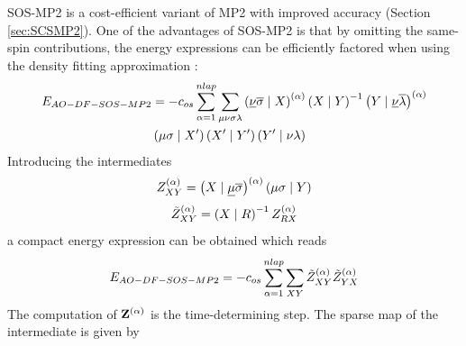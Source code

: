 SOS-MP2 is a cost-efficient variant of MP2 with improved  accuracy (Section \ref{sec:SCSMP2}). One of the advantages of SOS-MP2 is that by omitting the same-spin contributions, the energy expressions can be efficiently factored when using the density fitting approximation \cite{Mau2014,Gla2020}: 
\begin{equation}
\begin{split}
E_{AO-DF-SOS-MP2} &= - c_{os} \sum^{nlap}_{\alpha=1} \sum_{\mu\nu\sigma\lambda} \left( \underline{\nu}\overline{\sigma} \mid X \right)^{(\alpha)} \left( X \mid Y \right)^{-1} \left( Y \mid \underline{\nu}\overline{\lambda} \right)^{(\alpha)} \\
& \left( \mu\sigma \mid X' \right) \left( X' \mid Y' \right) \left( Y' \mid \nu\lambda \right)
\end{split}
\end{equation}
\noindent Introducing the intermediates
\begin{equation}
Z^{(\alpha)}_{XY} = \left( X \mid \underline{\mu}\overline{\sigma} \right)^{(\alpha)} \left( \mu\sigma \mid Y \right)
\end{equation}
\begin{equation}
\tilde{Z}^{(\alpha)}_{XY} = \left( X \mid R \right)^{-1} Z^{(\alpha)}_{RX}
\end{equation}
\noindent a compact energy expression can be obtained which reads
\begin{equation}
E_{AO-DF-SOS-MP2} = - c_{os} \sum^{nlap}_{\alpha=1} \sum_{XY} \tilde{Z}^{(\alpha)}_{XY} \tilde{Z}^{(\alpha)}_{YX} 
\end{equation}
\noindent The computation of $\mathbf{Z}^{(\alpha)}$ is the time-determining step. The sparse map of the intermediate is given by 
\begin{center}
\end{center}
